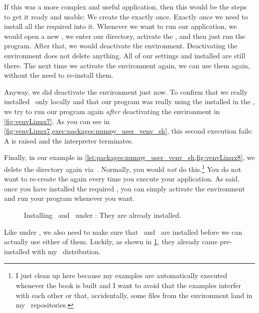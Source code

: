 If this was a more complex and useful application, then this would be the steps to get it ready and usable:
We create the  exactly once.
Exactly once we need to install all the required  into it.
Whenever we want to run our application, we would open a new , we enter our directory, activate the , and then just run the program.
After that, we would deactivate the environment.
Deactivating the environment does not delete anything.
All of our settings and installed  are still there.
The next time we activate the environment again, we can use them again, without the need to re-install them.

Anyway, we did deactivate the environment just now.
To confirm that we really installed \numpy\ only locally and that our program was really using the  installed in the , we try to run our program again \emph{after} deactivating the environment in \cref{fig:venvLinux7}.
As you can see in \cref{fig:venvLinux7,exec:packages:numpy_user_venv_sh}, this second execution fails:
A  is raised and the interpreter terminates.%
%
\begin{sloppypar}%
Finally, in our example in \cref{lst:packages:numpy_user_venv_sh,fig:venvLinux8}, we delete the  directory again via~.
Normally, you would \emph{not} do this.\footnote{%
I just clean up here because my examples are automatically executed whenever the book is built and I want to avoid that the examples interfer with each other or that, accidentally, some files from the environment land in my \git\ repositories.}
You do not want to re-create the  again every time you execute your application.
As said, once you have installed the required , you can simply activate the environment and run your program whenever you want.%
\end{sloppypar}%
%
\FloatBarrier%
\endhsection%
%
%
%
\begin{figure}%
\centering%
%
\caption{Installing \pip\ and \venv\ under \windows: They are already installed.}%
\label{fig:installPipVenvWindows}%
\end{figure}%
%
Like under \linux, we also need to make sure that \pip\ and \venv\ are installed before we can actually use either of them.
Luckily, as shown in \cref{fig:installPipVenvWindows}, they already came pre-installed with my \python\ distribution.

